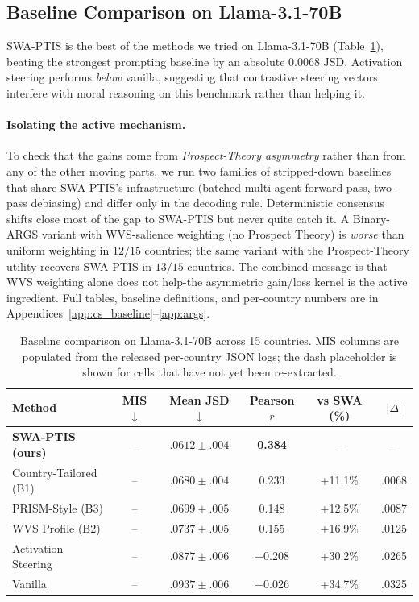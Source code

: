 \documentclass{article}
\begin{document}
\subsection{Baseline Comparison on Llama-3.1-70B}

SWA-PTIS is the best of the methods we tried on Llama-3.1-70B
(Table~\ref{tab:baselines}), beating the strongest prompting baseline by an
absolute $0.0068$ JSD. Activation steering performs \emph{below} vanilla,
suggesting that contrastive steering vectors interfere with moral reasoning
on this benchmark rather than helping it.

\paragraph{Isolating the active mechanism.}
To check that the gains come from \emph{Prospect-Theory asymmetry} rather than
from any of the other moving parts, we run two families of stripped-down
baselines that share SWA-PTIS's infrastructure (batched multi-agent forward
pass, two-pass debiasing) and differ only in the decoding rule. Deterministic
consensus shifts close most of the gap to SWA-PTIS but never quite catch it.
A Binary-ARGS variant with WVS-salience weighting (no Prospect Theory) is
\emph{worse} than uniform weighting in $12/15$ countries; the same variant
with the Prospect-Theory utility recovers SWA-PTIS in $13/15$ countries. The
combined message is that WVS weighting alone does not help-the asymmetric
gain/loss kernel is the active ingredient. Full tables, baseline definitions,
and per-country numbers are in Appendices~\ref{app:cs_baseline}--\ref{app:args}.

\begin{table}[t]
\caption{Baseline comparison on Llama-3.1-70B across 15 countries. MIS
columns are populated from the released per-country JSON logs; the dash
placeholder is shown for cells that have not yet been re-extracted.}
\label{tab:baselines}
\centering\small
\begin{tabular}{lccccc}
\toprule
Method & MIS $\downarrow$ & Mean JSD $\downarrow$ & Pearson $r$ & vs SWA (\%) & $|\Delta|$ \\
\midrule
\textbf{SWA-PTIS (ours)} & -- & $\mathbf{.0612 \pm.004}$ & \textbf{0.384} & -- & -- \\
Country-Tailored (B1) & -- & $.0680 \pm.004$ & 0.233 & +11.1\% & .0068 \\
PRISM-Style (B3) & -- & $.0699 \pm.005$ & 0.148 & +12.5\% & .0087 \\
WVS Profile (B2) & -- & $.0737 \pm.005$ & 0.155 & +16.9\% & .0125 \\
Activation Steering & -- & $.0877 \pm.006$ & $-$0.208 & +30.2\% & .0265 \\
Vanilla & -- & $.0937 \pm.006$ & $-$0.026 & +34.7\% & .0325 \\
\bottomrule
\end{tabular}
\end{table}
\end{document}
